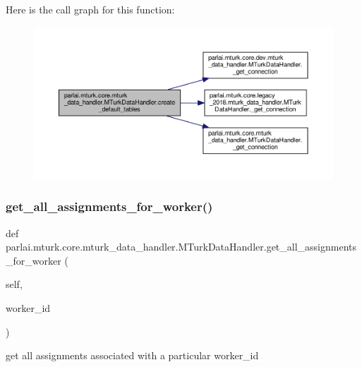 Here is the call graph for this function\+:
\nopagebreak
\begin{figure}[H]
\begin{center}
\leavevmode
\includegraphics[width=350pt]{classparlai_1_1mturk_1_1core_1_1mturk__data__handler_1_1MTurkDataHandler_a8427973bbee0e94309a60848f155206f_cgraph}
\end{center}
\end{figure}
\mbox{\label{classparlai_1_1mturk_1_1core_1_1mturk__data__handler_1_1MTurkDataHandler_a13d0c1ca0cf41f7f7aca992c995da261}} 
\subsubsection{\texorpdfstring{get\+\_\+all\+\_\+assignments\+\_\+for\+\_\+worker()}{get\_all\_assignments\_for\_worker()}}
{\footnotesize\ttfamily def parlai.\+mturk.\+core.\+mturk\+\_\+data\+\_\+handler.\+M\+Turk\+Data\+Handler.\+get\+\_\+all\+\_\+assignments\+\_\+for\+\_\+worker (\begin{DoxyParamCaption}\item[{}]{self,  }\item[{}]{worker\+\_\+id }\end{DoxyParamCaption})}

\begin{DoxyVerb}get all assignments associated with a particular worker_id\end{DoxyVerb}
 

